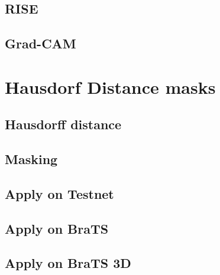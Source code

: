 \section{RISE}
\section{Grad-CAM}

\chapter{Hausdorf Distance masks}
\section{Hausdorff distance}
\section{Masking}
\section{Apply on Testnet}
\section{Apply on BraTS}
\section{Apply on BraTS 3D}
